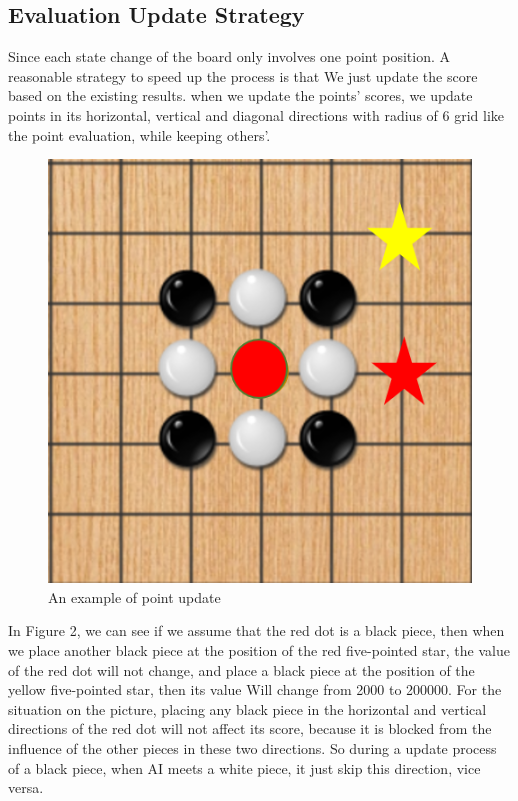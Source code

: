 \documentclass[a4paper, 12pt]{article} %
\begin{document}
\begin{multicols}{2}
    \subsection{Evaluation Update Strategy}
    Since each state change of the board only involves one point position. A reasonable strategy to speed up the process is that We just update the score based on the existing results. when we update the points' scores, we update points in its horizontal, vertical and diagonal directions with radius of 6 grid like the point evaluation, while keeping others'.
    \begin{figure}[H]
    	\centering
    	\includegraphics[scale=0.4]{example1.png}
    	\caption{An example of point update}
    	\label{figure}
    \end{figure}
    In Figure 2, we can see if we assume that the red dot is a black piece, then when we place another black piece at the position of the red five-pointed star, the value of the red dot will not change, and place a black piece at the position of the yellow five-pointed star, then its value Will change from 2000 to 200000. For the situation on the picture, placing any black piece in the horizontal and vertical directions of the red dot will not affect its score, because it is blocked from the influence of the other pieces in these two directions. So during a update process of a black piece, when AI meets a white piece, it just skip this direction, vice versa.

\end{multicols}
\end{document}
